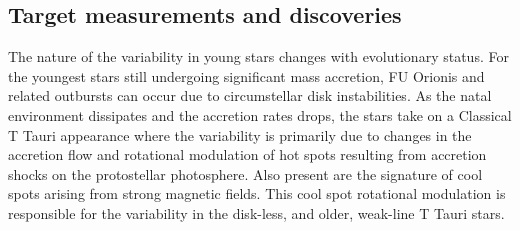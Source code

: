 


\subsection{Target measurements and discoveries}
\label{sec:\secname:targets}

The nature of the variability in young stars changes with evolutionary
status. For the youngest stars still undergoing significant mass
accretion, FU Orionis and related outbursts can occur due to
circumstellar disk instabilities. As the natal environment dissipates
and the accretion rates drops, the stars take on a Classical T Tauri
appearance where the variability is primarily due to changes in the
accretion flow and rotational modulation of hot spots resulting from
accretion shocks on the protostellar photosphere. Also present are the
signature of cool spots arising from strong magnetic fields. This cool
spot rotational modulation is responsible for the variability in the
disk-less, and older, weak-line T Tauri stars.





